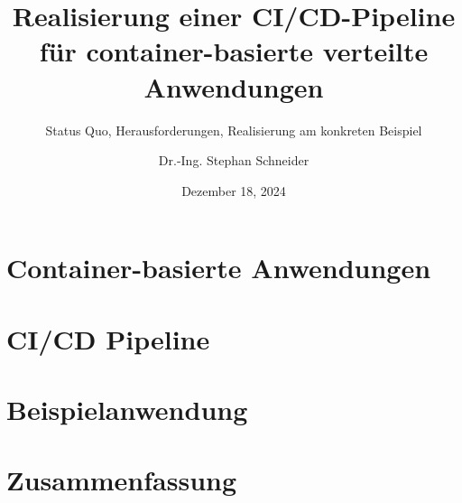 \documentclass[german,aspectratio=169]{beamer}
\title[Realisierung einer CI/CD-Pipeline]{Realisierung einer CI/CD-Pipeline\\ für container-basierte verteilte Anwendungen}
\subtitle{Status Quo, Herausforderungen, Realisierung am konkreten Beispiel}
\author{Dr.-Ing. Stephan Schneider}
\date{Dezember 18, 2024}
\begin{document}
	
	
	
	\section{Container-basierte Anwendungen}
	
	
	
	
	
	
	\section{CI/CD Pipeline}
	
	\section{Beispielanwendung}
	
	
	
	
	\section{Zusammenfassung}
	
	
\end{document}
